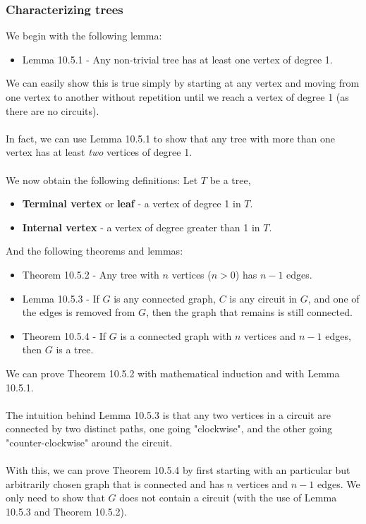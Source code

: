 \documentclass[a4paper]{article}
\begin{document}
\subsubsection{Characterizing trees}
We begin with the following lemma:
\begin{itemize}
	\item[] Lemma 10.5.1 - Any non-trivial tree has at least one vertex of degree 1. 
\end{itemize}
We can easily show this is true simply by starting at any vertex and moving from one vertex to another without repetition until we reach a vertex of degree 1 (as there are no circuits).\\\\
In fact, we can use Lemma 10.5.1 to show that any tree with more than one vertex has at least \textit{two} vertices of degree 1.\\\\
We now obtain the following definitions: Let $T$ be a tree,
\begin{itemize}
	\item[] \textbf{Terminal vertex} or \textbf{leaf} - a vertex of degree 1 in $T$.
	\item[] \textbf{Internal vertex} - a vertex of degree greater than 1 in $T$.
\end{itemize}
And the following theorems and lemmas:
\begin{itemize}
	\item[] Theorem 10.5.2 - Any tree with $n$ vertices ($n>0$) has $n-1$ edges.
	\item[] Lemma 10.5.3 - If $G$ is any connected graph, $C$ is any circuit in $G$, and one of the edges is removed from $G$, then the graph that remains is still connected.
	\item[] Theorem 10.5.4 - If $G$ is a connected graph with $n$ vertices and $n-1$ edges, then $G$ is a tree.
\end{itemize}
We can prove Theorem 10.5.2 with mathematical induction and with Lemma 10.5.1.\\\\
The intuition behind Lemma 10.5.3 is that any two vertices in a circuit are connected by two distinct paths, one going "clockwise", and the other going "counter-clockwise" around the circuit.\\\\
With this, we can prove Theorem 10.5.4 by first starting with an particular but arbitrarily chosen graph that is connected and has $n$ vertices and $n-1$ edges. We only need to show that $G$ does not contain a circuit (with the use of Lemma 10.5.3 and Theorem 10.5.2).
\end{document}
